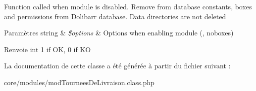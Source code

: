 Function called when module is disabled. Remove from database constants, boxes and permissions from Dolibarr database. Data directories are not deleted


\begin{DoxyParams}[1]{Paramètres}
string & {\em \$options} & Options when enabling module (\textquotesingle{}\textquotesingle{}, \textquotesingle{}noboxes\textquotesingle{}) \\
\hline
\end{DoxyParams}
\begin{DoxyReturn}{Renvoie}
int 1 if OK, 0 if KO 
\end{DoxyReturn}


La documentation de cette classe a été générée à partir du fichier suivant \+:\begin{DoxyCompactItemize}
\item 
core/modules/mod\+Tournees\+De\+Livraison.\+class.\+php\end{DoxyCompactItemize}
